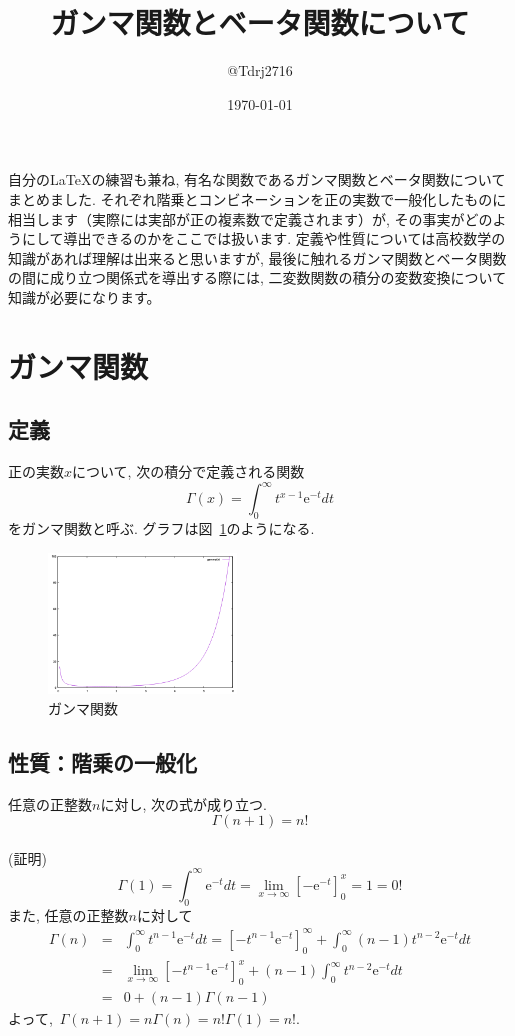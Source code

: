 \documentclass[a4paper,12pt,uplatex,dvipdfmx]{jsarticle}
\begin{document}
\title{ガンマ関数とベータ関数について}
\author{@Tdrj2716}
\date{\today}
\maketitle

自分の\LaTeX の練習も兼ね, 有名な関数であるガンマ関数とベータ関数についてまとめました. それぞれ階乗とコンビネーションを正の実数で一般化したものに相当します（実際には実部が正の複素数で定義されます）が, その事実がどのようにして導出できるのかをここでは扱います. 定義や性質については高校数学の知識があれば理解は出来ると思いますが, 最後に触れるガンマ関数とベータ関数の間に成り立つ関係式を導出する際には, 二変数関数の積分の変数変換について知識が必要になります。\\

\section{ガンマ関数}
\subsection{定義}
正の実数$x$について, 次の積分で定義される関数
\[
  \Gamma(x) = \int_0^\infty t^{x-1}\mathrm{e}^{-t} dt
\]
をガンマ関数と呼ぶ. グラフは図~\ref{fig:gamma}のようになる.
\begin{figure}[ht]
    \begin{center}
        \includegraphics[clip, width=5cm]{gamma.png}
        \caption{ガンマ関数}
        \label{fig:gamma}
    \end{center}
\end{figure}

\newpage
\subsection{性質：階乗の一般化}
任意の正整数$n$に対し, 次の式が成り立つ.
\[
    \Gamma(n+1) = n!
\] \\
(証明)
\[
    \Gamma(1) = \int_0^\infty \mathrm{e}^{-t} dt = \lim_{x \to \infty} [-\mathrm{e}^{-t}]_0^x = 1 = 0!
\]
また, 任意の正整数$n$に対して 
\begin{eqnarray*}
    \Gamma(n) & = & \int_0^\infty t^{n-1}\mathrm{e}^{-t} dt = [-t^{n-1}\mathrm{e}^{-t}]_0^{\infty} + \int_0^\infty (n-1)t^{n-2}\mathrm{e}^{-t} dt \\
    & = & \lim_{x \to \infty}[-t^{n-1}\mathrm{e}^{-t}]_0^x + (n-1)\int_0^\infty t^{n-2}\mathrm{e}^{-t} dt \\
    & = & 0 + (n-1)\Gamma(n-1) 
\end{eqnarray*}
よって,~$\Gamma(n+1) = n\Gamma(n) = n!\Gamma(1) = n!$. \\
\end{document}
